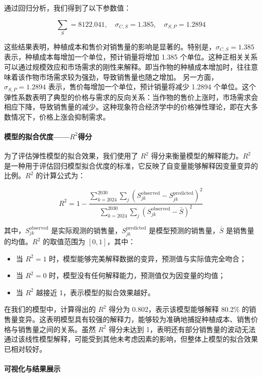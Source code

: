\documentclass[12pt,a4paper]{nmmcm}
\begin{document}
通过回归分析，我们得到了以下参数值：

\[
  \sum_S = 8122.041, \quad \sigma_{C,S} = 1.385, \quad \sigma_{S,P} = 1.2894
\]

这些结果表明，种植成本和售价对销售量的影响是显著的。特别是，$\sigma_{C,S} = 1.385$ 表示，种植成本每增加一个单位，预计销量将增加 1.385 个单位。这种正相关关系可以通过规模效应和市场需求的刚性来解释。即当作物的种植成本增加时，往往意味着该作物市场需求较为强劲，导致销售量也随之增加。
另一方面，$\sigma_{S,P} = 1.2894$ 表示，售价每增加一个单位，预计销量将减少 1.2894 个单位。这个弹性系数表明了典型的价格与需求的反向关系：当作物的售价上涨时，市场需求会相应下降，导致销售量的减少。这种现象符合经济学中的价格弹性理论，即在大多数情况下，价格上涨会抑制需求。

\paragraph{模型的拟合优度——$R^2$得分}

为了评估弹性模型的拟合效果，我们使用了 $R^2$ 得分来衡量模型的解释能力。$R^2$ 是一种用于评估回归模型拟合优度的标准，它反映了自变量能够解释因变量变异的比例。$R^2$ 的计算公式为：

\[
  R^2 = 1 - \frac{\sum_{k=2024}^{2030} \sum_{j} \left( S_{jk}^{\text{observed}} - S_{jk}^{\text{predicted}} \right)^2}{\sum_{k=2024}^{2030} \sum_{j} \left( S_{jk}^{\text{observed}} - \bar{S} \right)^2}
\]

其中，$S_{jk}^{\text{observed}}$ 是实际观测的销售量，$S_{jk}^{\text{predicted}}$ 是模型预测的销售量，$\bar{S}$ 是销售量的均值。$R^2$ 的取值范围为 $[0,1]$，其中：
\begin{itemize}
  \item 当 $R^2 = 1$ 时，模型能够完美解释数据的变异，预测值与实际值完全吻合；
  \item 当 $R^2 = 0$ 时，模型没有任何解释能力，预测值仅为因变量的均值；
  \item 当 $R^2$ 越接近 1，表示模型的拟合效果越好。
\end{itemize}

在我们的模型中，计算得出的 $R^2$ 得分为 0.802，表示该模型能够解释 80.2\% 的销售量变异。这表明模型具有较强的解释力，能够较为准确地捕捉种植成本、销售价格与销售量之间的关系。虽然 $R^2$ 得分未达到 1，表明还有部分销售量的波动无法通过该线性模型解释，可能受到其他未考虑因素的影响，但整体上模型的拟合效果已相对较好。

\paragraph{可视化与结果展示}
\end{document}

